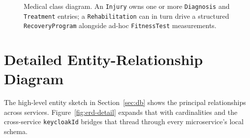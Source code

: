 \documentclass[12pt,a4paper,oneside]{report}
\begin{document}
\begin{figure}[ht]
\caption{Medical class diagram. An \texttt{Injury} owns one or more
         \texttt{Diagnosis} and \texttt{Treatment} entries; a
         \texttt{Rehabilitation} can in turn drive a structured
         \texttt{RecoveryProgram} alongside ad-hoc
         \texttt{FitnessTest} measurements.}
\label{fig:class-medical}
\end{figure}

\section{Detailed Entity-Relationship Diagram}
\label{sec:erd}

The high-level entity sketch in
Section~\ref{sec:db} shows the principal relationships across
services. Figure~\ref{fig:erd-detail} expands that with cardinalities
and the cross-service \texttt{keycloakId} bridges that thread through
every microservice's local schema.
\end{document}
